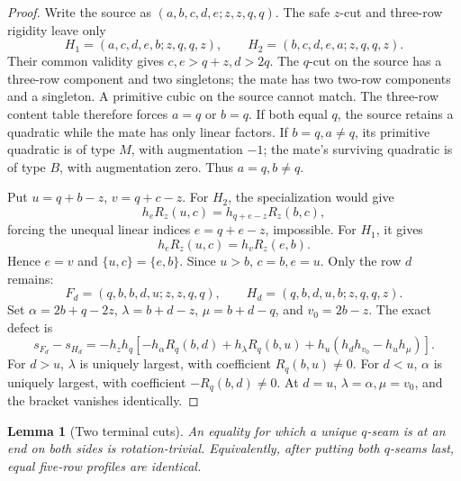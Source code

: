 \documentclass[11pt,a4paper]{amsart}
\numberwithin{equation}{section}
\theoremstyle{plain}
\newtheorem{lemma}[theorem]{Lemma}
\theoremstyle{definition}
\begin{document}
\begin{proof}
Write the source as \((a,b,c,d,e;z,z,q,q)\).  The safe \(z\)-cut and
three-row rigidity leave only
\[
 H_1=(a,c,d,e,b;z,q,q,z),\qquad
 H_2=(b,c,d,e,a;z,q,q,z).
\]
Their common validity gives \(c,e>q+z,d>2q\).
The \(q\)-cut on the source has a three-row component and two
singletons; the mate has two two-row components and a singleton.
A primitive cubic on the source cannot match.  The three-row content
table therefore forces \(a=q\) or \(b=q\).
If both equal \(q\), the source retains a quadratic while the mate
has only linear factors.  If \(b=q,a\ne q\), its primitive quadratic
is of type \(M\), with augmentation \(-1\); the mate's surviving
quadratic is of type \(B\), with augmentation zero.
Thus \(a=q,b\ne q\).

Put \(u=q+b-z\), \(v=q+c-z\).  For \(H_2\), the specialization
would give
\[
 h_eR_z(u,c)=h_{q+e-z}R_z(b,c),
\]
forcing the unequal linear indices \(e=q+e-z\), impossible.
For \(H_1\), it gives
\[
 h_eR_z(u,c)=h_vR_z(e,b).
\]
Hence \(e=v\) and \(\{u,c\}=\{e,b\}\).  Since \(u>b\),
\(c=b,e=u\).  Only the row \(d\) remains:
\[
 F_d=(q,b,b,d,u;z,z,q,q),\qquad
 H_d=(q,b,d,u,b;z,q,q,z).
\]
Set
\(\alpha=2b+q-2z\), \(\lambda=b+d-z\),
\(\mu=b+d-q\), and \(v_0=2b-z\).  The exact defect is
\[
 s_{F_d}-s_{H_d}
 =-h_zh_q\left[
 -h_\alpha R_q(b,d)+h_\lambda R_q(b,u)
 +h_u(h_dh_{v_0}-h_uh_\mu)\right].
\]
For \(d>u\), \(\lambda\) is uniquely largest, with coefficient
\(R_q(b,u)\ne0\).  For \(d<u\), \(\alpha\) is uniquely largest,
with coefficient \(-R_q(b,d)\ne0\).  At \(d=u\),
\(\lambda=\alpha,\mu=v_0\), and the bracket vanishes identically.
\end{proof}

\begin{lemma}[Two terminal cuts]\label{lem:staircase-four-plus-one}
An equality for which a unique \(q\)-seam is at an end on both sides is
rotation-trivial.  Equivalently, after putting both
\(q\)-seams last, equal five-row profiles are identical.
\end{lemma}
\end{document}
